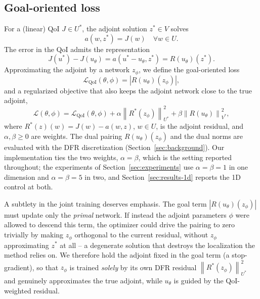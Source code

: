 \documentclass[preprint,11pt]{elsarticle}
\newcommand{\norm}[1]{\left\|#1\right\|}
\begin{document}
\subsection{Goal-oriented loss}

For a (linear) QoI $J \in U^*$, the adjoint solution $z^* \in V$ solves
\begin{equation}
    a(w, z^*) = J(w) \quad \forall w \in U.
\end{equation}
The error in the QoI admits the representation
\begin{equation}
    \label{eq:error-rep}
    J(u^*) - J(u_\theta) = a(u^* - u_\theta, z^*) = R(u_\theta)(z^*).
\end{equation}
Approximating the adjoint by a network $z_\phi$, we define the goal-oriented loss
\begin{equation}
    \mathcal{L}_{\text{QoI}}(\theta, \phi) = |R(u_\theta)(z_\phi)|,
\end{equation}
and a regularized objective that also keeps the adjoint network close to the true adjoint,
\begin{equation}
    \mathcal{L}(\theta, \phi) = \mathcal{L}_{\text{QoI}}(\theta, \phi)
        + \alpha \norm{R^*(z_\phi)}_{U^*}^2
        + \beta \norm{R(u_\theta)}_{V^*}^2,
\end{equation}
where $R^*(z)(w) = J(w) - a(w, z)$, $w \in U$, is the adjoint residual, and $\alpha, \beta \geq 0$ are weights. The dual pairing $R(u_\theta)(z_\phi)$ and the dual norms are evaluated with the DFR discretization (Section~\ref{sec:background}). Our implementation ties the two weights, $\alpha = \beta$, which is the setting reported throughout; the experiments of Section~\ref{sec:experiments} use $\alpha = \beta = 1$ in one dimension and $\alpha = \beta = 5$ in two, and Section~\ref{sec:results-1d} reports the 1D control at both.

A subtlety in the joint training deserves emphasis. The goal term $|R(u_\theta)(z_\phi)|$ must update only the \emph{primal} network. If instead the adjoint parameters $\phi$ were allowed to descend this term, the optimizer could drive the pairing to zero trivially by making $z_\phi$ orthogonal to the current residual, without $z_\phi$ approximating $z^*$ at all -- a degenerate solution that destroys the localization the method relies on. We therefore hold the adjoint fixed in the goal term (a stop-gradient), so that $z_\phi$ is trained \emph{solely} by its own DFR residual $\norm{R^*(z_\phi)}_{U^*}^2$ and genuinely approximates the true adjoint, while $u_\theta$ is guided by the QoI-weighted residual.
\end{document}
